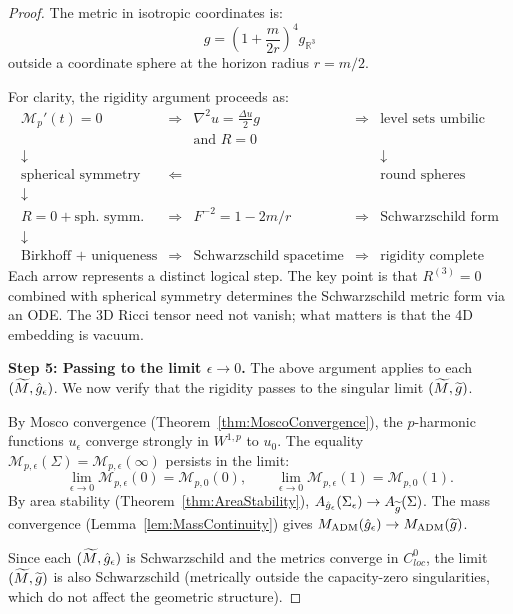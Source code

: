 \begin{proof}
The metric in isotropic coordinates is:
\[
    g = \left(1 + \frac{m}{2r}\right)^4 g_{\mathbb{R}^3}
\]
outside a coordinate sphere at the horizon radius $r = m/2$.

\begin{remark}\label{rem:RigidityLogicalChain}
For clarity, the rigidity argument proceeds as:
\[
\begin{array}{ccccc}
\mathcal{M}_p'(t) = 0 & \Rightarrow & \nabla^2 u = \frac{\Delta u}{2}g & \Rightarrow & \text{level sets umbilic} \\
& & \text{and } R = 0 & & \\
\downarrow & & & & \downarrow \\
\text{spherical symmetry} & \Longleftarrow & & & \text{round spheres} \\
\downarrow & & & & \\
R = 0 + \text{sph.\ symm.} & \Rightarrow & F^{-2} = 1 - 2m/r & \Rightarrow & \text{Schwarzschild form} \\
\downarrow & & & & \\
\text{Birkhoff + uniqueness} & \Rightarrow & \text{Schwarzschild spacetime} & \Rightarrow & \text{rigidity complete}
\end{array}
\]
Each arrow represents a distinct logical step. The key point is that $R^{(3)} = 0$ combined with spherical symmetry determines the Schwarzschild metric form via an ODE. The 3D Ricci tensor need not vanish; what matters is that the 4D embedding is vacuum.
\end{remark}

\textbf{Step 5: Passing to the limit $\epsilon \to 0$.}
The above argument applies to each $(\widetilde{M}, \hat{g}_\epsilon)$. We now verify that the rigidity passes to the singular limit $(\widetilde{M}, \widetilde{g})$.

By Mosco convergence (Theorem~\ref{thm:MoscoConvergence}), the $p$-harmonic functions $u_\epsilon$ converge strongly in $W^{1,p}$ to $u_0$. The equality $\mathcal{M}_{p,\epsilon}(\Sigma) = \mathcal{M}_{p,\epsilon}(\infty)$ persists in the limit:
\[
    \lim_{\epsilon \to 0} \mathcal{M}_{p,\epsilon}(0) = \mathcal{M}_{p,0}(0), \qquad \lim_{\epsilon \to 0} \mathcal{M}_{p,\epsilon}(1) = \mathcal{M}_{p,0}(1).
\]
By area stability (Theorem~\ref{thm:AreaStability}), $A_{\hat{g}_\epsilon}(\Sigma_\epsilon) \to A_{\widetilde{g}}(\Sigma)$. The mass convergence (Lemma~\ref{lem:MassContinuity}) gives $M_{\mathrm{ADM}}(\hat{g}_\epsilon) \to M_{\mathrm{ADM}}(\widetilde{g})$.

Since each $(\widetilde{M}, \hat{g}_\epsilon)$ is Schwarzschild and the metrics converge in $C^0_{loc}$, the limit $(\widetilde{M}, \widetilde{g})$ is also Schwarzschild (metrically outside the capacity-zero singularities, which do not affect the geometric structure).


\end{proof}

